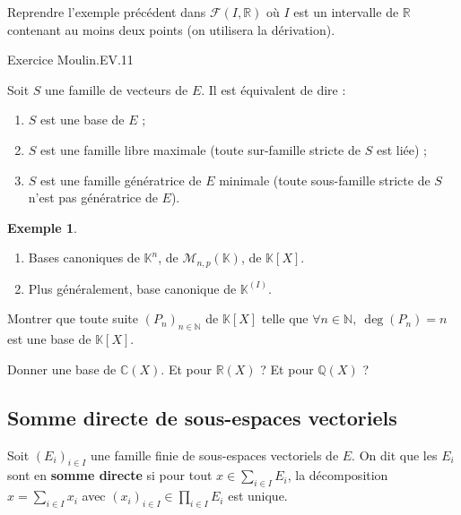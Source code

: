 \documentclass[french]{article}
\newcommand{\N}{\mathbb{N}}
\newcommand{\Q}{\mathbb{Q}}
\newcommand{\R}{\mathbb{R}}
\newcommand{\C}{\mathbb{C}}
\newcommand{\K}{\mathbb{K}}
\theoremstyle{plain}
\theoremstyle{definition}
\newtheorem*{ex}{Exemple}
\theoremstyle{remark}
\begin{document}
\begin{exo}
	Reprendre l'exemple précédent dans $\mathcal{F}(I,\R)$ où $I$ est un intervalle de $\R$ contenant au moins deux points (on utilisera la dérivation).
\end{exo}

Exercice Moulin.EV.11

\begin{thm}
	Soit $S$ une famille de vecteurs de $E$. Il est équivalent de dire :
	\begin{enumerate}[label=(\roman*)]
		\item $S$ est une base de $E$ ;
		\item $S$ est une famille libre maximale (toute sur-famille stricte de $S$ est liée) ;
		\item $S$ est une famille génératrice de $E$ minimale (toute sous-famille stricte de $S$ n'est pas génératrice de $E$).
	\end{enumerate}
\end{thm}

\begin{ex}
	\begin{enumerate}
		\item Bases canoniques de $\K^n$, de $\mathcal{M}_{n,p}(\K)$, de $\K[X]$.
		\item Plus généralement, base canonique de $\K^{(I)}$.
	\end{enumerate}
\end{ex}

\begin{exo}
	Montrer que toute suite $(P_n)_{n\in\N}$ de $\K[X]$ telle que $\forall n\in\N,\ \deg(P_n)=n$ est une base de $\K[X]$.
\end{exo} %

\begin{exo}
	Donner une base de $\C(X)$. Et pour $\R(X)$ ? Et pour $\Q(X)$ ? %
\end{exo}
\subsection{Somme directe de sous-espaces vectoriels}

\begin{dfn}
	Soit $(E_i)_{i\in I}$ une famille finie de sous-espaces vectoriels de $E$. On dit que les $E_i$ sont en \textbf{somme directe} si pour tout $x\in\displaystyle\sum_{i\in I} E_i$, la décomposition $\displaystyle x=\sum_{i\in I}x_i$ avec $(x_i)_{i\in I}\in\displaystyle\prod_{i\in I} E_i$ est unique.
\end{dfn}
\end{document}

